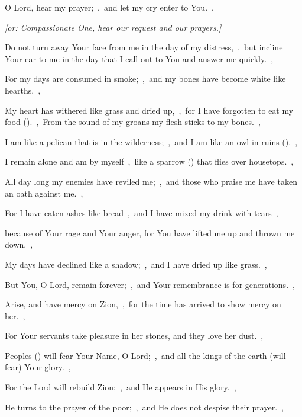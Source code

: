 \documentclass[12pt,twoside,a5paper]{article}
\begin{document}


\begin{normalparskip}
  O Lord, hear my prayer;~\sep\ and let my cry enter to You.~\sep


  \emph{[or: Compassionate One, hear our request and our prayers.]}

  Do not turn away Your face from me in the day of my distress,~\sep\ but incline Your ear to me in the day that I call out to You and answer me quickly.~\sep

  For my days are consumed in smoke;~\sep\ and my bones have become white like hearths.~\sep

  My heart has withered like grass and dried up,~\sep\ for I have forgotten to eat my food ().~\sep\ From the sound of my groans my flesh sticks to my bones.~\sep

  I am like a pelican that is in the wilderness;~\sep\ and I am like an owl in ruins ().~\sep

  I remain alone and am by myself~\sep\ like a sparrow () that flies over housetops.~\sep

  All day long my enemies have reviled me;~\sep\ and those who praise me have taken an oath against me.~\sep

  For I have eaten ashes like bread~\sep\ and I have mixed my drink with tears~\sep

  because of Your rage and Your anger, for You have lifted me up and thrown me down.~\sep

  My days have declined like a shadow;~\sep\ and I have dried up like grass.~\sep

  But You, O Lord, remain forever;~\sep\ and Your remembrance is for generations.~\sep

  Arise, and have mercy on Zion,~\sep\ for the time has arrived to show mercy on her.~\sep

  For Your servants take pleasure in her stones, and they love her dust.~\sep

  Peoples () will fear Your Name, O Lord;~\sep\ and all the kings of the earth (will fear) Your glory.~\sep

  For the Lord will rebuild Zion;~\sep\ and He appears in His glory.~\sep

  He turns to the prayer of the poor;~\sep\ and He does not despise their prayer.~\sep


\end{normalparskip}
\end{document}
